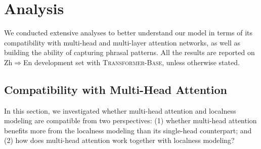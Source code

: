 \documentclass[11pt,a4paper]{article}
\begin{document}
\iffalse
We integrate the proposed model into \emph{Base} (\textsc{Transformer-Base}) and \emph{Big} model (\textsc{Transformer-Big}) to compare with the exsiting NMT systems on WMT17 Chinese-English and WMT14 English-German translation tasks, concluding in the Table~\ref{tab:exist}. The difference between the two set of models has been introduced in Section~\ref{sec:setup}. Experimental results demonstrate that the localness model outperforms either the baseline or the relative position encoding enhanced model (``Rel\_Pos''). Contrast with relative position encoding which only enhanced the neighbor information around the query, the proposed model provides more extensive spaces to locate the neighbouring scopes. In addition, through combining the localness model with the relative position encoding, our systems gain further improvements that achieving even comparable results with almost three times less parameters (108.8M/303.9M) against baseline of \emph{Big} model. This reveals that the two approach is able to complement each other.  Integrating the above achievements into the \emph{Big} model of \textsc{Transformer}, the proposed model achieves state-of-the-art results under the single model setting\footnote{The best single system reported in \cite{hassan2018achieving} is trained using additional 7M back-translation data and achieved 27.40 BLUE score. For a fair comparison, we did not refer to this result in the table.} on both Chinese-English and English-German translation tasks. 
\fi




\section{Analysis}

We conducted extensive analyses to better understand our model in terms of its compatibility with multi-head and multi-layer attention networks, as well as building the ability of capturing phrasal patterns. All the results are reported on Zh$\Rightarrow$En development set with \textsc{Transformer-Base}, unless otherwise stated.


\subsection{Compatibility with Multi-Head Attention}
\label{sec:multi-head}

In this section, we investigated whether multi-head attention and localness modeling are compatible from two perspectives: (1) whether multi-head attention benefits more from the localness modeling than its single-head counterpart; and (2) how does multi-head attention work together with localness modeling?
\end{document}
